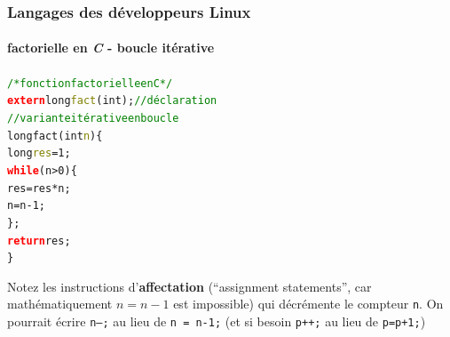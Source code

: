 \documentclass[xcolor=svgnames,final,smaller,a4]{beamer}
\begin{document}
\begin{frame}
  \frametitle{Langages des développeurs Linux}
  \framesubtitle{factorielle en \textit{C} - boucle itérative}

  \begin{relsize}{-1}
  \begin{alltt}
    \textcolor{green}{/*fonction factorielle en C*/}\\
    \textcolor{red}{\textbf{extern}} long \textcolor{Olive}{fact}(int);  \textcolor{green}{//déclaration}\\
    \textcolor{green}{//variante itérative en boucle}\\
    long fact(int  \textcolor{Olive}{n}) \{\\
    \hspace{0.5cm}long \textcolor{Olive}{res} = 1;\\
    \hspace{0.5cm}\textcolor{red}{\textbf{while}} (n > 0) \{\\
    \hspace{1cm}res = res * n;\\
    \hspace{1cm}n = n - 1;\\
    \hspace{0.5cm}\};\\
    \hspace{0.5cm}\textcolor{red}{\textbf{return}} res;\\
    \}
  \end{alltt}
  \end{relsize}
  
  Notez les instructions d'\textbf{affectation} (``assignment statements'',
  car mathématiquement $n = n -1$ est impossible) qui décrémente le
  compteur \texttt{n}. On pourrait écrire \texttt{n--;} au lieu de \texttt{n = n-1;} (et si besoin \texttt{p++;} au lieu de \texttt{p=p+1;})
\end{frame}
\end{document}
